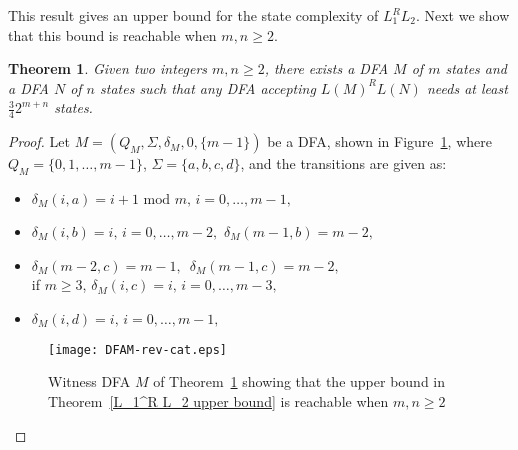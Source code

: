 \documentclass[10pt]{article}
\newtheorem{theorem}{Theorem}
\begin{document}
This result gives an upper bound for the state complexity of $L_1^R
L_2$. Next we show that this bound is reachable when $m,n \ge 2$.


\begin{theorem}
\label{L_1^R L_2 lower bound} Given two integers $m,n\geq 2$, there
exists a DFA $M$ of $m$ states and a DFA $N$ of $n$ states such that
any DFA accepting $L(M)^R L(N)$ needs at least $\frac{3}{4}2^{m+n}$
states.
\end{theorem}
\begin{proof}
Let $M=(Q_M,\Sigma , \delta_M , 0, \{m-1\} )$ be a DFA, shown in
Figure~\ref{DFAM-rev-cat}, where $Q_M = \{0,1,\ldots ,m-1\}$,
$\Sigma = \{a,b,c,d\}$, and the transitions are given as:
\begin{itemize}
\item $\delta_M(i, a) = i+1 \mbox{ mod }m \mbox{, } i=0, \ldots , m-1,$
\item $\delta_M(i, b) = i \mbox{, } i=0, \ldots , m-2,$ $\delta_M(m-1, b) = m-2 \mbox{, }$
\item $\delta_M(m-2, c) = m-1 \mbox{, }$ $\delta_M(m-1, c) = m-2 \mbox{,}$\\
 if $m\geq 3$, $\delta_M(i, c) = i \mbox{, } i=0, \ldots , m-3,$
\item $\delta_M(i, d) = i \mbox{, } i=0, \ldots , m-1,$
\end{itemize}
\begin{figure}[ht]
  \begin{center}
  \texttt{[image: DFAM-rev-cat.eps]}
  \end{center}
  \caption{Witness DFA $M$ of Theorem~\ref{L_1^R L_2 lower bound} showing that the upper bound in Theorem~\ref{L_1^R L_2 upper bound} is reachable when $m, n \ge 2$}
\label{DFAM-rev-cat}
\end{figure}


\end{proof}
\end{document}
